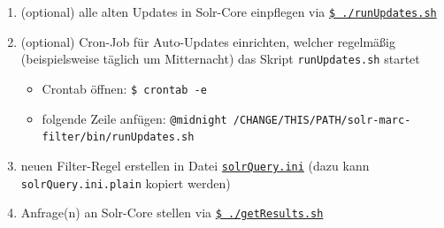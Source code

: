 \documentclass[10pt]{article}
\begin{document}
\begin{enumerate}
	\item (optional) alle alten Updates in Solr-Core einpflegen via \hyperref[sec:para:runUpdates]{\texttt{\$ ./runUpdates.sh}}
	\item (optional) Cron-Job für Auto-Updates einrichten, welcher regelmäßig (beispielsweise täglich um Mitternacht) das Skript \texttt{runUpdates.sh} startet
	\begin{itemize}
		\item Crontab öffnen: \texttt{\$ crontab -e}
		\item folgende Zeile anfügen: \texttt{@midnight /CHANGE/THIS/PATH/solr-marc-filter/bin/runUpdates.sh}
	\end{itemize}
	\item neuen Filter-Regel erstellen in Datei \hyperref[sec:para:runUpdates]{\texttt{solrQuery.ini}} (dazu kann \texttt{solrQuery.ini.plain} kopiert werden)
	\item Anfrage(n) an Solr-Core stellen via \hyperref[sec:para:getResults]{\texttt{\$ ./getResults.sh}}
	
\end{enumerate}



\newpage
\end{document}
